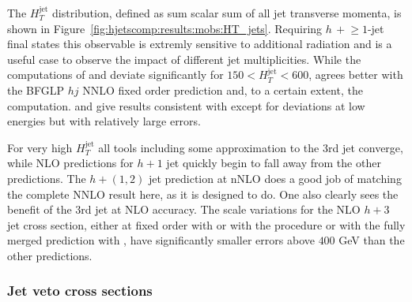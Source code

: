 
The $H_T^\text{jet}$ distribution, defined as sum scalar sum of all jet 
transverse momenta, is shown in Figure~\ref{fig:hjetscomp:results:mobs:HT_jets}. 
Requiring $h\,+\!\ge\!\!1$-jet final states this observable is
extremly sensitive to additional radiation and is a useful case to observe
the impact of different jet multiplicities. While the \NNLOPS 
computations of \Sherpa and \Powheg deviate significantly for 
$150 < H_T^\text{jet} < 600$, \Sherpa \NNLOPS agrees better with 
the BFGLP $hj$ NNLO fixed order prediction and, to a certain extent, 
the \Sherpa \MEPSatNLO computation. \Herwig and \MGaMC give results 
consistent with \Powheg except for deviations at low energies but with 
relatively large errors.

For very high $H_T^\text{jet}$ all tools including some approximation to the 3rd
jet converge, while NLO predictions for $h+1$ jet quickly begin to fall away
from the other predictions. The \Loopsim $h+(1,2)$ jet prediction at nNLO does a good
job of matching the complete NNLO result here, as it is designed to do. One also
clearly sees the benefit of the 3rd jet at NLO accuracy.  The scale variations
for the NLO $h+3$ jet cross section,  either at fixed order with \Loopsim or  with the \Minlo
procedure or with the fully merged prediction with \Sherpa \MEPSatNLO, have
significantly smaller errors above $400$ GeV than the other predictions.



\clearpage
\subsubsection{Jet veto cross sections}
\label{sec:hjetscomp:results:jvobs}


